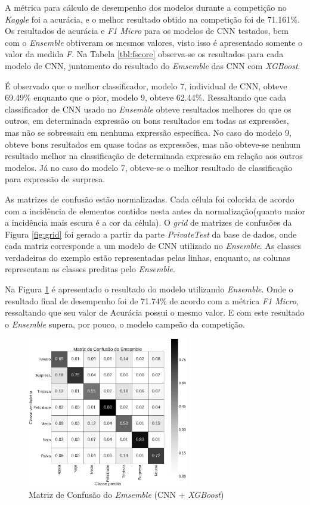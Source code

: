 A métrica para cálculo de desempenho dos modelos durante a competição no \emph{Kaggle} foi a acurácia, e o melhor resultado obtido na competição foi de 71.161\%. Os resultados de acurácia e \emph{F1 Micro} para os modelos de CNN testados, bem com o \emph{Ensemble} obtiveram os mesmos valores, visto isso é apresentado somente o valor da medida \emph{F}. Na Tabela \ref{tbl:fscore} observa-se os resultados para cada modelo de CNN, juntamento do resultado do \emph{Emsemble} das CNN com \emph{XGBoost}.

É observado que o melhor classificador, modelo 7, individual de CNN, obteve 69.49\% enquanto que o pior, modelo 9, obteve 62.44\%. Ressaltando que cada classificador de CNN usado no \emph{Ensemble} obteve resultados melhores do que os outros, em determinada expressão ou bons resultados em todas as expressões, mas não se sobressaiu em nenhuma expressão específica. No caso do modelo 9, obteve bons resultados em quase todas as expressões, mas não obteve-se nenhum resultado melhor na classificação de determinada expressão em relação aos outros modelos. Já no caso do modelo 7, obteve-se o melhor resultado de classificação para expressão de surpresa.



As matrizes de confusão estão normalizadas. Cada célula foi colorida de acordo com a incidência de elementos contidos nesta antes da normalização(quanto maior a incidência mais escura é a cor da célula). O \emph{grid} de matrizes de confusões da Figura \ref{fig:grid} foi gerado a partir da parte \emph{PrivateTest} da base de dados, onde cada matriz corresponde a um modelo de CNN utilizado no \emph{Ensemble}. As classes verdadeiras do exemplo estão representadas pelas linhas, enquanto, as colunas representam as classes preditas pelo \emph{Ensemble}.

Na Figura \ref{fig:emsemble} é apresentado o resultado do modelo utilizando \emph{Ensemble}. Onde o resultado final de desempenho foi de 71.74\% de acordo com a métrica \emph{F1 Micro}, ressaltando que seu valor de Acurácia possui o mesmo valor. E com este resultado o \emph{Ensemble} supera, por pouco, o modelo campeão da competição.

\begin{figure}[!htb]
    \centering
    \includegraphics[width=7cm]{images/cm_emsemble.png}
    \caption{Matriz de Confusão do \emph{Emsemble} (CNN + \emph{XGBoost})}
    \label{fig:emsemble}
\end{figure}
